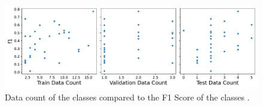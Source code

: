 \begin{figure}[h]
\centering
\captionsetup{width=0.9\linewidth}
\includegraphics[width=1.0\textwidth]{figures/f1_per_class_to_data_distribution.pdf}
\caption{Data count of the classes compared to the F1 Score of the classes .}
\label{tab:f1_per_class_to_data_distribution}
\end{figure}
